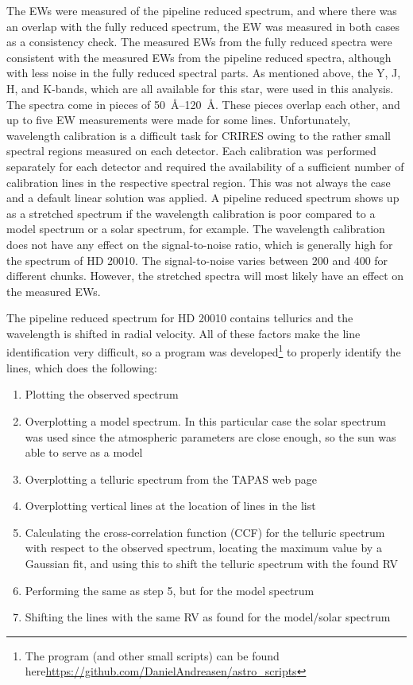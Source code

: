 The EWs were measured of the pipeline reduced spectrum, and where there was an overlap with the
fully reduced spectrum, the EW was measured in both cases as a consistency check. The measured EWs
from the fully reduced spectra were consistent with the measured EWs from the pipeline reduced
spectra, although with less noise in the fully reduced spectral parts. As mentioned above, the Y, J,
H, and K-bands, which are all available for this star, were used in this analysis. The spectra come
in pieces of \SIrange{50}{120}{\angstrom}. These pieces overlap each other, and up to five EW
measurements were made for some lines. Unfortunately, wavelength calibration is a difficult task for
CRIRES owing to the rather small spectral regions measured on each detector. Each calibration was
performed separately for each detector and required the availability of a sufficient number of
calibration lines in the respective spectral region. This was not always the case and a default
linear solution was applied. A pipeline reduced spectrum shows up as a stretched spectrum if the
wavelength calibration is poor compared to a model spectrum or a solar spectrum, for example. The
wavelength calibration does not have any effect on the signal-to-noise ratio, which is generally
high for the spectrum of HD 20010. The signal-to-noise varies between 200 and 400 for different
chunks. However, the stretched spectra will most likely have an effect on the measured EWs.

The pipeline reduced spectrum for HD 20010 contains tellurics and the wavelength is shifted in
radial velocity. All of these factors make the line identification very difficult, so a program was
developed\footnote{The program (and other small scripts) can be found
here\url{https://github.com/DanielAndreasen/astro_scripts}} to properly identify the lines, which
does the following:

\begin{enumerate}
  \item Plotting the observed spectrum
  \item Overplotting a model spectrum. In this particular case the solar spectrum was used since the
        atmospheric parameters are close enough, so the sun was able to serve as a model
  \item Overplotting a telluric spectrum from the TAPAS web page \citep{Bertaux2014}
  \item Overplotting vertical lines at the location of lines in the list
  \item Calculating the cross-correlation function (CCF) for the telluric spectrum with respect to
        the observed spectrum, locating the maximum value by a Gaussian fit, and using this to shift
        the telluric spectrum with the found RV
  \item Performing the same as step 5, but for the model spectrum
  \item Shifting the lines with the same RV as found for the model/solar spectrum
\end{enumerate}


